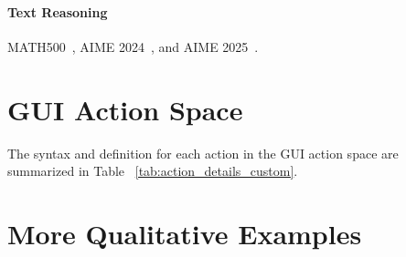 \paragraph{Text Reasoning}
MATH500~\citep{hendrycks2020measuring}, AIME 2024~\citep{AIME}, and AIME 2025~\citep{AIME25}.

\section{GUI Action Space}
\label{sec:gui_action_space}
The syntax and definition for each action in the GUI action space are summarized in Table ~\ref{tab:action_details_custom}.




\section{More Qualitative Examples}
\label{sec:more_cases}
\clearpage




